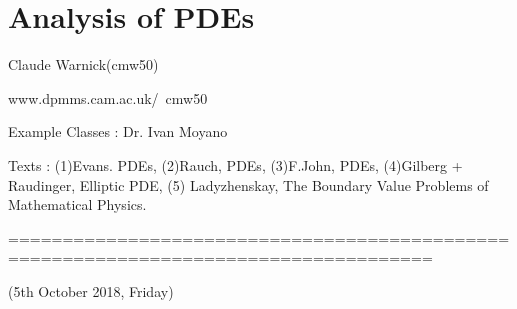 \documentclass[10pt,a4paper]{report}
\DeclarePairedDelimiter\bignorm{\lVert}{\rVert}
\begin{document}
\newcommand{\thm}{\textbf{Theorem) }}
\newcommand{\thmnum}[1]{\textbf{Theorem #1) }}
\newcommand{\defi}{\textbf{Definition) }}
\newcommand{\definum}[1]{\textbf{Definition #1) }}
\newcommand{\lem}{\textbf{Lemma) }}
\newcommand{\lemnum}[1]{\textbf{Lemma #1) }}
\newcommand{\prop}{\textbf{Proposition) }}
\newcommand{\propnum}[1]{\textbf{Proposition #1) }}
\newcommand{\corr}{\textbf{Corollary) }}
\newcommand{\corrnum}[1]{\textbf{Corollary #1) }}
\newcommand{\pf}{\textbf{proof) }}

\newcommand{\lap}{\triangle} %
\newcommand{\s}{\vspace{10pt}}
\newcommand{\bull}{$\bullet$}
\newcommand{\sta}{$\star$}
\newcommand{\reals}{\mathbb{R}}

\newcommand{\eop}{\hfill  \textsl{(End of proof)} $\square$} %
\newcommand{\eos}{\hfill  \textsl{(End of statement)} $\square$} %


\newcommand{\intN}{\mathbb{Z}_N}
\newcommand{\nat}{\mathbb{N}}
\newcommand{\norms}[2]{\bignorm[\big]{#1}_{#2}}
\newcommand{\abs}[1]{\big| #1 \big|}
\newcommand{\avg}{\mathbb{E}}
\newcommand{\prob}{\mathbb{P}}
\newcommand{\borel}{\mathscr{B}}
\newcommand{\EE}{\mathscr{E}}
\newcommand{\pa}{\partial}

\renewcommand{\bar}{\overline}

\def\doubleunderline#1{\underline{\underline{#1}}}

\newcommand{\newday}{===============================================================}
\newcommand{\digression}{**********************************************************************************************}


\setlength\parindent{0pt}

\chapter*{Analysis of PDEs}
\s

Claude Warnick(cmw50)

www.dpmms.cam.ac.uk/~cmw50

Example Classes : Dr. Ivan Moyano
\s

Texts : (1)Evans. PDEs, (2)Rauch, PDEs, (3)F.John, PDEs, (4)Gilberg + Raudinger, Elliptic PDE, (5) Ladyzhenskay, The Boundary Value Problems of Mathematical Physics.
\s

=====================================================================================

(5th October 2018, Friday)
\s
\end{document}
